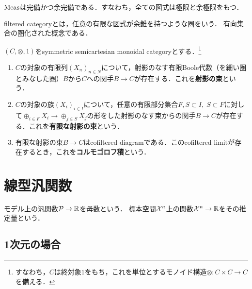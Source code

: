 \documentclass[uplatex,dvipdfmx]{jsreport}
\begin{document}
\begin{proposition}[完備かつ余完備]
    $\mathrm{Meas}$は完備かつ余完備である．すなわち，全ての図式は極限と余極限をもつ．
\end{proposition}

\begin{definition}
    filtered categoryとは，任意の有限な図式が余錐を持つような圏をいう．
    有向集合の圏化された概念である．
\end{definition}

\begin{definition}
    $(C,\otimes,1)$をsymmetric semicartesian monoidal categoryとする．\footnote{すなわち，$C$は終対象$1$をもち，これを単位とするモノイド構造$\otimes:C\times C\to C$を備える．}
    \begin{enumerate}
        \item $C$の対象の有限列$(X_n)_{n\in N}$について，射影のなす有限Boole代数（を細い圏とみなした圏）$B$から$C$への関手$B\to C$が存在する．これを\textbf{射影の束}という．
        \item $C$の対象の族$(X_i)_{i\in I}$について，任意の有限部分集合$F,S\subset I,\;S\subset F$に対して$\oplus_{i\in F}X_i\to\oplus_{j\in S}X_j$の形をした射影のなす束からの関手$B\to C$が存在する．これを\textbf{有限な射影の束}という．
        \item 有限な射影の束$B\to C$はcofiltered diagramである．このcofiltered limitが存在するとき，これを\textbf{コルモゴロフ積}という．
    \end{enumerate}
\end{definition}

\section{線型汎関数}

\begin{tcolorbox}[colframe=ForestGreen, colback=ForestGreen!10!white,breakable,colbacktitle=ForestGreen!40!white,coltitle=black,fonttitle=\bfseries\sffamily,
title=統計的問題では線型汎関数の推定が主眼となる所以である]
    モデル上の汎関数$\mathcal{P}\to\mathbb{R}$を母数という．
    標本空間$\mathcal{X}^n$上の関数$\mathcal{X}^n\to\mathbb{R}$をその推定量という．
\end{tcolorbox}

\subsection{1次元の場合}
\end{document}
